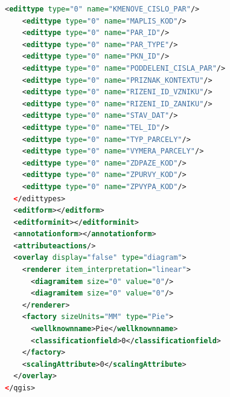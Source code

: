 \documentclass[a4paper,12pt,oneside]{book}
\begin{document}
\begin{lstlisting}[language=XML]
    <edittype type="0" name="KMENOVE_CISLO_PAR"/>
    <edittype type="0" name="MAPLIS_KOD"/>
    <edittype type="0" name="PAR_ID"/>
    <edittype type="0" name="PAR_TYPE"/>
    <edittype type="0" name="PKN_ID"/>
    <edittype type="0" name="PODDELENI_CISLA_PAR"/>
    <edittype type="0" name="PRIZNAK_KONTEXTU"/>
    <edittype type="0" name="RIZENI_ID_VZNIKU"/>
    <edittype type="0" name="RIZENI_ID_ZANIKU"/>
    <edittype type="0" name="STAV_DAT"/>
    <edittype type="0" name="TEL_ID"/>
    <edittype type="0" name="TYP_PARCELY"/>
    <edittype type="0" name="VYMERA_PARCELY"/>
    <edittype type="0" name="ZDPAZE_KOD"/>
    <edittype type="0" name="ZPURVY_KOD"/>
    <edittype type="0" name="ZPVYPA_KOD"/>
  </edittypes>
  <editform></editform>
  <editforminit></editforminit>
  <annotationform></annotationform>
  <attributeactions/>
  <overlay display="false" type="diagram">
    <renderer item_interpretation="linear">
      <diagramitem size="0" value="0"/>
      <diagramitem size="0" value="0"/>
    </renderer>
    <factory sizeUnits="MM" type="Pie">
      <wellknownname>Pie</wellknownname>
      <classificationfield>0</classificationfield>
    </factory>
    <scalingAttribute>0</scalingAttribute>
  </overlay>
</qgis>
\end{lstlisting}






\end{document}
